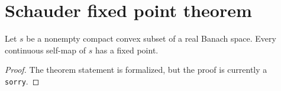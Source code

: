 \section{Schauder fixed point theorem}

\begin{theorem}
\label{thm:schauder-fixed-point}
\notready
Let $s$ be a nonempty compact convex subset of a real Banach space. Every continuous self-map of $s$ has a fixed point.
\end{theorem}

\begin{proof}
The theorem statement is formalized, but the proof is currently a \texttt{sorry}.
\end{proof}
